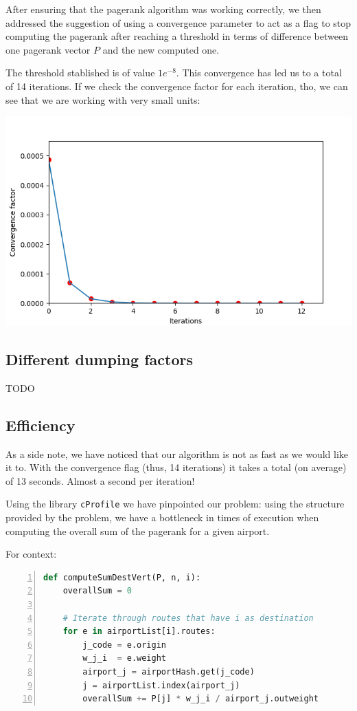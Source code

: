 \documentclass[10pt, a4paper]{article}
\begin{document}
\noindent After ensuring that the pagerank algorithm was working correctly, we then addressed the suggestion of using a convergence parameter to act as a flag to stop computing the pagerank after reaching a threshold in terms of difference between one pagerank vector $P$ and the new computed one.

The threshold stablished is of value  $1e^{-8}$.  This convergence has led us to a total of 14 iterations. If we check the convergence factor for each iteration, tho, we can see that we are working with very small units:
\begin{center}
        \includegraphics[width=0.75\linewidth]{plot_conv.png}
\end{center}


\subsection{Different dumping factors}

TODO

\subsection{Efficiency}
As a side note, we have noticed that our algorithm is not as fast as we would like it to. With the convergence flag (thus, 14 iterations) it takes a total (on average) of 13 seconds. Almost a second per iteration!

Using the library \texttt{cProfile} we have pinpointed our problem: using the structure provided by the problem, 
we have a bottleneck in times of execution when computing the overall sum of the pagerank for a given airport. 

For context:

\begin{lstlisting}[language=Python,  breaklines=true, numbers=left,   frame=single]
def computeSumDestVert(P, n, i):
    overallSum = 0

    # Iterate through routes that have i as destination
    for e in airportList[i].routes:
        j_code = e.origin
        w_j_i  = e.weight
        airport_j = airportHash.get(j_code)
        j = airportList.index(airport_j)
        overallSum += P[j] * w_j_i / airport_j.outweight
\end{lstlisting}
\end{document}
